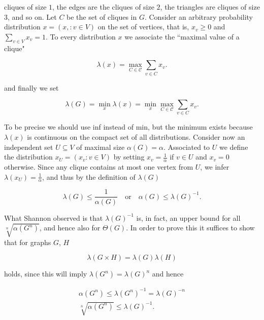 \documentclass[12pt]{memoir}
\newcommand{\setsecondpagemargins}{
    \clearpage
    \setulmarginsandblock{2cm}{0.5cm}{*}
    \checkandfixthelayout
}
\begin{document}
\setsecondpagemargins

cliques of size $1$, the edges are the cliques of size $2$, the triangles are cliques 
of size $3$, and so on. Let $C$ be the set of cliques in $G$. Consider an arbitrary 
probability distribution $x = (x, : v \in V)$ on the set of vertices, that 
is, $x_v \geq 0$ and $\sum_{v \in V} x_v = 1$. To every distribution $x$ we associate 
the ``maximal value of a clique"

\begin{equation*}
\lambda(x) = \max_{C \in \mathcal{C}} \sum_{v\in C} x_v.
\end{equation*}

and finally we set

\begin{equation*}
\lambda(G) = \min_x\lambda(x) = \min_x\max_{C \in \mathcal{C}} \sum_{v\in C} x_v.
\end{equation*}

To be precise we should use inf instead of min, but the minimum exists
because $\lambda(x)$ is continuous on the compact set of all distributions.
Consider now an independent set $U \subseteq V$ of maximal size $\alpha(G) = \alpha $.
Associated to $U$ we define the distribution $x_U  = (x_v : v \in V)$ by setting 
$x_v = \frac{1}{\alpha}$ if $v \in U$ and $x_v = 0$ otherwise. Since any clique contains at most 
one vertex from $U$,  we infer $\lambda(x_U) = \frac{1}{\alpha} $, 
and thus by the definition of $\lambda(G)$

\begin{equation*}
\lambda(G) \leq \frac{1}{\alpha(G)} \quad \text{or} \quad \alpha(G) \leq \lambda(G)^{-1}.
\end{equation*}

What Shannon observed is that $\lambda(G)^{-1}$ is, in fact, an upper bound for all 
$\sqrt[n]{\alpha(G^n)}$, and hence also for $\Theta(G)$. In order to prove this it suffices to 
show that for graphs $G$, $H$

\begin{equation}
\lambda(G \times H) = \lambda(G)\lambda(H) \label{one}
\end{equation}

holds, since this will imply $\lambda(G^n) = \lambda(G)^n$ and hence

\begin{equation*}
  \begin{align*}
  \alpha(G^n) \leq \lambda(G^n)^{-1} = \lambda(G)^{-n} \\
  \sqrt[n]{\alpha(G^n)} \leq \lambda(G)^{-1}.
  \end{align*}
\end{equation*}
\end{document}
